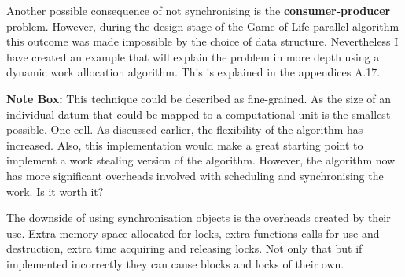 \documentclass[11pt]{article} %
\begin{document}
Another possible consequence of not synchronising is the {\bf consumer-producer} problem. However, during the design stage of the Game of Life parallel algorithm this outcome was made impossible by the choice of data structure. Nevertheless I have created an example that will explain the problem in more depth using a dynamic work allocation algorithm. \cite[p10]{ref13} This is explained in the appendices A.17.
\smallskip
\begin{mdframed}
{\bf Note Box: } This technique could be described as fine-grained. As the size of an individual datum that could be mapped to a computational unit is the smallest possible. One cell. As discussed earlier, the flexibility of the algorithm has increased. Also, this implementation would make a great starting point to implement a work stealing version of the algorithm. However, the algorithm now has more significant overheads involved with scheduling and synchronising the work. Is it worth it?
\end{mdframed}
\smallskip
The downside of using synchronisation objects is the overheads created by their use. Extra memory space allocated for locks, extra functions calls for use and destruction, extra time acquiring and releasing locks. Not only that but if implemented incorrectly they can cause blocks and locks of their own. \cite[Granularity]{ref15}
\end{document}
